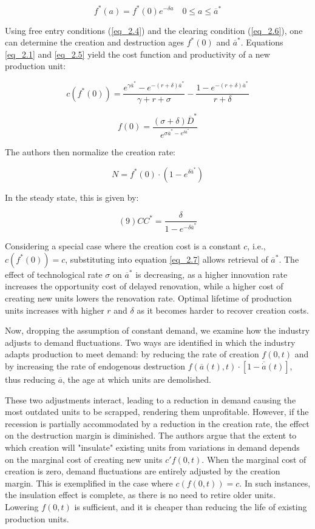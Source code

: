 \documentclass[12pt]{article}
\begin{document}
\[f^*(a) = f^*(0)e^{-\delta a} \quad 0 \leq a \leq \overline{a}^*\]

Using free entry conditions (\ref{eq_2.4}) and the clearing condition (\ref{eq_2.6}), one can determine the creation and
destruction ages \(f^*(0)\) and \(\overline{a}^*\). Equations \ref{eq_2.1} and \ref{eq_2.5} yield the cost function and
productivity of a new production unit: 

\[\label{eq_2.7} c(f^*(0)) = \frac{e^{\gamma \overline{a}^*} - e^{-(r + \delta)\overline{a}^*}}{\gamma + r + \sigma} - \frac{1 - e^{-(r + \delta)\overline{a}^*}}{r + \delta}\]

\[\label{eq_2.8} f(0) = \frac{(\sigma + \delta)\overline{D}^*}{e^{\sigma \overline{a}^* - e^{\delta \overline{a}^*}}}\]

The authors then normalize the creation rate:

\[N = f^*(0) \cdot (1 - e^{\delta \overline{a}^*})\]

In the steady state, this is given by:

\[(9) \label{eq2.9}CC^* = \frac{\delta}{1 - e^{-\delta \overline{a}^*}}\]

Considering a special case where the creation cost is a constant \(c\), i.e., \(c(f^*(0)) = c\), substituting into
equation \ref{eq_2.7} allows retrieval of \(\overline{a}^*\). The effect of technological rate \(\sigma\) on
\(\overline{a}^*\) is decreasing, as a higher innovation rate increases the opportunity cost of delayed renovation,
while a higher cost of creating new units lowers the renovation rate. Optimal lifetime of production units increases
with higher \(r\) and \(\delta\) as it becomes harder to recover creation costs. 

Now, dropping the assumption of constant demand, we examine how the industry adjusts to demand fluctuations. Two ways
are identified in which the industry adapts production to meet demand: by reducing the rate of creation \(f(0,t)\) and
by increasing the rate of endogenous destruction \(f(\overline{a}(t),t) \cdot [1-\overline{\dot{a}}(t)]\), thus reducing
\(\overline{a}\), the age at which units are demolished. 

These two adjustments interact, leading to a reduction in demand causing the most outdated units to be scrapped,
rendering them unprofitable. However, if the recession is partially accommodated by a reduction in the creation rate,
the effect on the destruction margin is diminished. The authors argue that the extent to which creation will "insulate"
existing units from variations in demand depends on the marginal cost of creating new units \(c'f(0,t)\). When the
marginal cost of creation is zero, demand fluctuations are entirely adjusted by the creation margin. This is exemplified
in the case where \(c(f(0,t)) = c\). In such instances, the insulation effect is complete, as there is no need to retire
older units. Lowering \(f(0,t)\) is sufficient, and it is cheaper than reducing the life of existing production units. 
\end{document}
